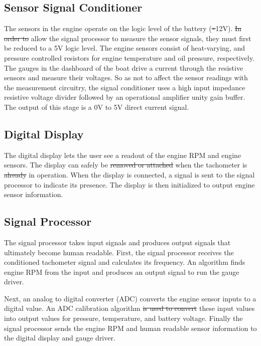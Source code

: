 \documentclass[11pt]{article}
\providecommand{\DIFaddtex}[1]{{\protect\color{blue}\uwave{#1}}} %
\providecommand{\DIFdeltex}[1]{{\protect\color{red}\sout{#1}}}                      %
\providecommand{\DIFaddbegin}{} %
\providecommand{\DIFaddend}{} %
\providecommand{\DIFdelbegin}{} %
\providecommand{\DIFdelend}{} %
\providecommand{\DIFadd}[1]{\texorpdfstring{\DIFaddtex{#1}}{#1}} %
\providecommand{\DIFdel}[1]{\texorpdfstring{\DIFdeltex{#1}}{}} %
\newcommand{\DIFscaledelfig}{0.5}
\newlength{\DIFdelgraphicswidth} %
\newlength{\DIFdelgraphicsheight} %
\newcommand{\DIFaddincludegraphics}[2][]{{\color{blue}\fbox{\DIFOincludegraphics[#1]{#2}}}} %
\newcommand{\DIFdelincludegraphics}[2][]{%
\sbox{\DIFdelgraphicsbox}{\DIFOincludegraphics[#1]{#2}}%
\settoboxwidth{\DIFdelgraphicswidth}{\DIFdelgraphicsbox} %
\settoboxtotalheight{\DIFdelgraphicsheight}{\DIFdelgraphicsbox} %
\scalebox{\DIFscaledelfig}{%
\parbox[b]{\DIFdelgraphicswidth}{\usebox{\DIFdelgraphicsbox}\\[-\baselineskip] \rule{\DIFdelgraphicswidth}{0em}}\llap{\resizebox{\DIFdelgraphicswidth}{\DIFdelgraphicsheight}{%
\setlength{\unitlength}{\DIFdelgraphicswidth}%
\begin{picture}(1,1)%
\thicklines\linethickness{2pt} %
{\color[rgb]{1,0,0}\put(0,0){\framebox(1,1){}}}%
{\color[rgb]{1,0,0}\put(0,0){\line( 1,1){1}}}%
{\color[rgb]{1,0,0}\put(0,1){\line(1,-1){1}}}%
\end{picture}%
}\hspace*{3pt}}} %
} %
\DeclareRobustCommand{\DIFaddbegin}{\DIFOaddbegin \let\includegraphics\DIFaddincludegraphics} %
\DeclareRobustCommand{\DIFaddend}{\DIFOaddend \let\includegraphics\DIFOincludegraphics} %
\DeclareRobustCommand{\DIFdelbegin}{\DIFOdelbegin \let\includegraphics\DIFdelincludegraphics} %
\DeclareRobustCommand{\DIFdelend}{\DIFOaddend \let\includegraphics\DIFOincludegraphics} %
\begin{document}
\subsection{Sensor Signal Conditioner}

The sensors in the engine operate on the logic level of the battery (\DIFdelbegin \DIFdel{\~}\DIFdelend \DIFaddbegin \DIFadd{$\sim$}\DIFaddend 12V). \DIFdelbegin \DIFdel{In order to }\DIFdelend \DIFaddbegin \DIFadd{To }\DIFaddend allow the signal processor to measure the sensor signals, they must first be reduced to a 5V logic level. The engine sensors consist of heat-varying, and pressure controlled resistors for engine temperature and oil pressure, respectively. The gauges in the dashboard of the boat drive a current through the resistive sensors and measure their voltages. So as not to affect the sensor readings with the measurement circuitry, the signal conditioner uses a high input impedance resistive voltage divider followed by an operational amplifier unity gain buffer. The output of this stage is a 0V to 5V direct current signal.

\subsection{Digital Display}

The digital display lets the user see a readout of the engine RPM and engine sensors. The display can safely be \DIFdelbegin \DIFdel{removed or attached }\DIFdelend \DIFaddbegin \DIFadd{hot swapped }\DIFaddend when the tachometer is \DIFdelbegin \DIFdel{already }\DIFdelend in operation. When the display is connected, a signal is sent to the signal processor to indicate its presence. The display is then initialized to output engine sensor information.

\subsection{Signal Processor}
The signal processor takes input signals and produces output signals that ultimately become human readable. First, the signal processor receives the conditioned tachometer signal and calculates its frequency. An algorithm finds engine RPM from the input and produces an output signal to run the gauge driver.

Next, an analog to digital converter (ADC) converts the engine sensor inputs to a digital value. An ADC calibration algorithm \DIFdelbegin \DIFdel{is used to convert }\DIFdelend \DIFaddbegin \DIFadd{converts }\DIFaddend these input values into output values for pressure, temperature, and battery voltage. Finally the signal processor sends the engine RPM and human readable sensor information to the digital display and gauge driver.
\end{document}
